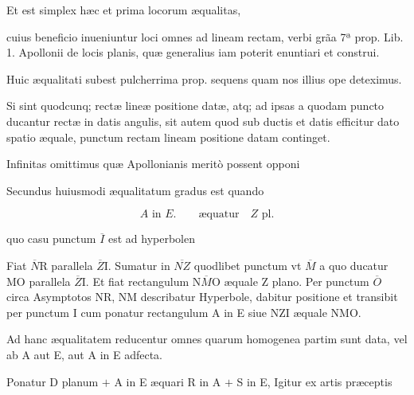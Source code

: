 \documentclass[11pt,a4paper]{article}
\begin{document}
Et est simplex hæc et prima locorum æqualitas,


cuius beneficio inueniuntur loci omnes ad lineam rectam, verbi grãa 7ª prop. Lib. 1. Apollonii de locis planis, quæ generalius iam poterit enuntiari et construi.

Huic æqualitati subest pulcherrima prop. sequens quam nos illius ope deteximus.

Si sint quodcunq; rectæ lineæ positione datæ, atq; ad ipsas a quodam puncto ducantur rectæ in datis angulis, sit autem quod sub ductis et datis efficitur dato spatio æquale, punctum rectam lineam positione datam continget.

Infinitas omittimus quæ Apollonianis meritò possent opponi

Secundus huiusmodi æqualitatum gradus est quando

\[ A \text{ in } E. \qquad \text{æquatur} \quad Z \text{ pl.} \]

quo casu punctum $\overline{I}$ est ad hyperbolen


Fiat $\overline{N}$R parallela $\overline{Z}$I. Sumatur in $\overline{NZ}$ quodlibet punctum vt $\overline{M}$ a quo ducatur MO parallela $\overline{Z}$I. Et fiat rectangulum N$\overline{M}$O æquale Z plano. Per punctum $\overline{O}$ circa Asymptotos NR, NM describatur Hyperbole, dabitur positione et transibit per punctum I cum ponatur rectangulum A in E siue NZI æquale NMO.

Ad hanc æqualitatem reducentur omnes quarum homogenea partim sunt data, vel ab A aut E, aut A in E adfecta.

Ponatur D planum $+$ A in E æquari R in A $+$ S in E, Igitur ex artis præceptis
\end{document}
